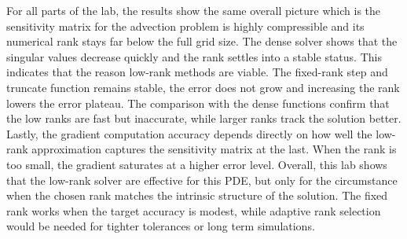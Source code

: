 \documentclass[11pt]{article}
\begin{document}
For all parts of the lab, the results show the same overall picture which is the sensitivity matrix for the advection problem is highly compressible and its numerical rank stays far below the full grid size. The dense solver shows that the singular values decrease quickly and the rank settles into a stable status. This indicates that the reason low-rank methods are viable. The fixed-rank step and truncate function remains stable, the error does not grow and increasing the rank lowers the error plateau. The comparison with the dense functions confirm that the low ranks are fast but inaccurate, while larger ranks track the solution better. Lastly, the gradient computation accuracy depends directly on how well the low-rank approximation captures the sensitivity matrix at the last. When the rank is too small, the gradient saturates at a higher error level. Overall, this lab shows that the low-rank solver are effective for this PDE, but only for the circumstance when the chosen rank matches the intrinsic structure of the solution. The fixed rank works when the target accuracy is modest, while adaptive rank selection would be needed for tighter tolerances or long term simulations.

\end{document}
